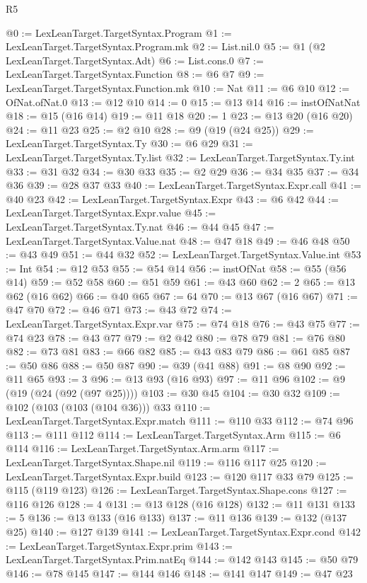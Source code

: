 \begin{lexlean}{R5}
\begin{coremodule}
@0 := LexLeanTarget.TargetSyntax.Program
@1 := LexLeanTarget.TargetSyntax.Program.mk
@2 := List.nil.{0}
@5 := @1 (@2 LexLeanTarget.TargetSyntax.Adt)
@6 := List.cons.{0}
@7 := LexLeanTarget.TargetSyntax.Function
@8 := @6 @7
@9 := LexLeanTarget.TargetSyntax.Function.mk
@10 := Nat
@11 := @6 @10
@12 := OfNat.ofNat.{0}
@13 := @12 @10
@14 := 0
@15 := @13 @14
@16 := instOfNatNat
@18 := @15 (@16 @14)
@19 := @11 @18
@20 := 1
@23 := @13 @20 (@16 @20)
@24 := @11 @23
@25 := @2 @10
@28 := @9 (@19 (@24 @25))
@29 := LexLeanTarget.TargetSyntax.Ty
@30 := @6 @29
@31 := LexLeanTarget.TargetSyntax.Ty.list
@32 := LexLeanTarget.TargetSyntax.Ty.int
@33 := @31 @32
@34 := @30 @33
@35 := @2 @29
@36 := @34 @35
@37 := @34 @36
@39 := @28 @37 @33
@40 := LexLeanTarget.TargetSyntax.Expr.call
@41 := @40 @23
@42 := LexLeanTarget.TargetSyntax.Expr
@43 := @6 @42
@44 := LexLeanTarget.TargetSyntax.Expr.value
@45 := LexLeanTarget.TargetSyntax.Ty.nat
@46 := @44 @45
@47 := LexLeanTarget.TargetSyntax.Value.nat
@48 := @47 @18
@49 := @46 @48
@50 := @43 @49
@51 := @44 @32
@52 := LexLeanTarget.TargetSyntax.Value.int
@53 := Int
@54 := @12 @53
@55 := @54 @14
@56 := instOfNat
@58 := @55 (@56 @14)
@59 := @52 @58
@60 := @51 @59
@61 := @43 @60
@62 := 2
@65 := @13 @62 (@16 @62)
@66 := @40 @65
@67 := 64
@70 := @13 @67 (@16 @67)
@71 := @47 @70
@72 := @46 @71
@73 := @43 @72
@74 := LexLeanTarget.TargetSyntax.Expr.var
@75 := @74 @18
@76 := @43 @75
@77 := @74 @23
@78 := @43 @77
@79 := @2 @42
@80 := @78 @79
@81 := @76 @80
@82 := @73 @81
@83 := @66 @82
@85 := @43 @83 @79
@86 := @61 @85
@87 := @50 @86
@88 := @50 @87
@90 := @39 (@41 @88)
@91 := @8 @90
@92 := @11 @65
@93 := 3
@96 := @13 @93 (@16 @93)
@97 := @11 @96
@102 := @9 (@19 (@24 (@92 (@97 @25))))
@103 := @30 @45
@104 := @30 @32
@109 := @102 (@103 (@103 (@104 @36))) @33
@110 := LexLeanTarget.TargetSyntax.Expr.match
@111 := @110 @33
@112 := @74 @96
@113 := @111 @112
@114 := LexLeanTarget.TargetSyntax.Arm
@115 := @6 @114
@116 := LexLeanTarget.TargetSyntax.Arm.arm
@117 := LexLeanTarget.TargetSyntax.Shape.nil
@119 := @116 @117 @25
@120 := LexLeanTarget.TargetSyntax.Expr.build
@123 := @120 @117 @33 @79
@125 := @115 (@119 @123)
@126 := LexLeanTarget.TargetSyntax.Shape.cons
@127 := @116 @126
@128 := 4
@131 := @13 @128 (@16 @128)
@132 := @11 @131
@133 := 5
@136 := @13 @133 (@16 @133)
@137 := @11 @136
@139 := @132 (@137 @25)
@140 := @127 @139
@141 := LexLeanTarget.TargetSyntax.Expr.cond
@142 := LexLeanTarget.TargetSyntax.Expr.prim
@143 := LexLeanTarget.TargetSyntax.Prim.natEq
@144 := @142 @143
@145 := @50 @79
@146 := @78 @145
@147 := @144 @146
@148 := @141 @147
@149 := @47 @23

\end{coremodule}
\end{lexlean}
